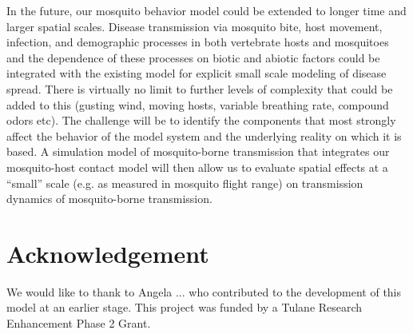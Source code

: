 \documentclass[12pt]{article}
\begin{document}
In the future, our mosquito behavior model could be extended to longer time and larger spatial scales. Disease transmission via mosquito bite, host movement, infection, and demographic processes in both vertebrate hosts and mosquitoes and the dependence of these processes on biotic and abiotic factors could be integrated with the existing model for explicit small scale modeling of disease spread. There is virtually no limit to further levels of complexity that could be added to this (gusting wind, moving hosts, variable breathing rate, compound odors etc). The challenge will be to identify the components that most strongly affect the behavior of the model system and the underlying reality on which it is based.
%
A simulation model of mosquito-borne transmission that integrates our mosquito-host contact model will then allow us to evaluate spatial effects  at a ``small'' scale (e.g. as measured in mosquito flight range) on transmission dynamics of mosquito-borne transmission.
%
\section*{Acknowledgement}
We would like to thank to Angela ...  who contributed to the development of this model at an earlier stage. This project was funded by a Tulane Research Enhancement Phase 2 Grant.
%
	
\newpage  
%
\end{document}
